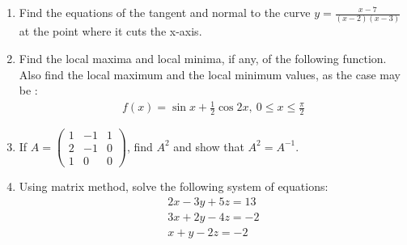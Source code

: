 \documentclass[10pt,-letter paper]{article}
\providecommand{\brak}[1]{\ensuremath{\left(#1\right)}}
\newcommand{\myvec}[1]{\ensuremath{\begin{pmatrix}#1\end{pmatrix}}}
\begin{document}
\begin{enumerate}
\item Find the equations of the tangent and normal to the curve $y = \frac{x - 7}{\brak{x - 2}\brak{x - 3}}$ at the point where it cuts the x-axis.
\item Find the local maxima and local minima, if any, of the following function. Also find the local maximum and the local minimum values, as the case may be : 
	\begin{align*}
		f\brak{x} = \sin {x} + \frac{1}{2} \cos{2x}, ~0\leq{x}\leq \frac{\pi}{2}
	\end{align*}
\item If $A=\myvec{1&-1&1 \\ 2&-1&0 \\ 1&0&0}$, find $A^2$ and show that $A^2 = A^{-1}$.
\item Using matrix method, solve the following system of equations:
	\begin{align*}
		2{x}-3{y}+5{z}=13 \\
		3{x}+2{y}-4{z}=-2 \\
		{x}+{y}-2{z}=-2
	\end{align*}
\end{enumerate}
\end{document}
